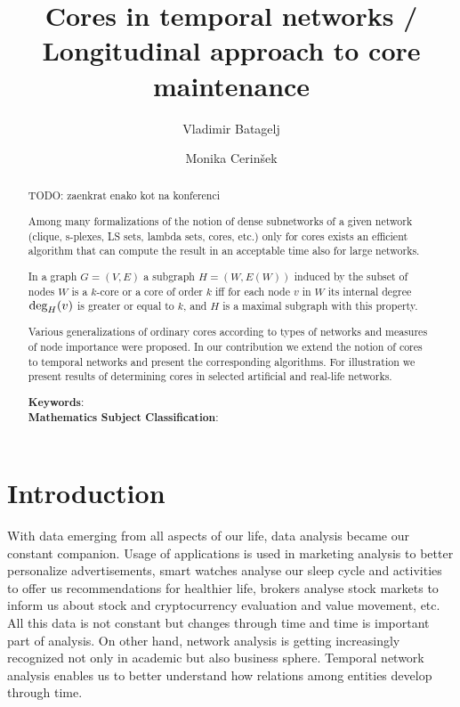 \documentclass[a4paper,twoside,10pt]{article}
\newcommand{\Deg}{\mbox{\rm{deg}}}
\begin{document}
\pagestyle{empty}


\title{Cores in temporal networks / Longitudinal approach to core maintenance}
\author{Vladimir Batagelj}
\author{Monika Cerin\v sek}
\maketitle

\pagestyle{plain}

%
%

\begin{abstract}
TODO: zaenkrat enako kot na konferenci

Among many formalizations of the notion of dense subnetworks of a given network (clique, s-plexes, LS sets, lambda sets, cores, etc.) only for cores exists an efficient algorithm that can compute the result in an acceptable time also for large networks.

In a graph $G = (V, E)$ a subgraph $H = (W, E(W))$ induced by the subset of nodes $W$ is a $k$-core or a core of order $k$ iff for each node $v$ in $W$ its internal degree $\Deg_H(v)$ is greater or equal to $k$, and $H$ is a maximal subgraph with this property.

Various generalizations of ordinary cores according to types of networks and measures of node importance were proposed. In our contribution we extend the notion of cores to temporal networks and present the corresponding algorithms. For illustration we present results of determining cores in selected artificial and real-life networks.

\noindent
{\bf Keywords}: \\
{\bf Mathematics Subject Classification}:

\end{abstract}




\section{Introduction}\label{intro}
With data emerging from all aspects of our life, data analysis became our constant companion. Usage of applications is used in marketing analysis to better personalize advertisements, smart watches analyse our sleep cycle and activities to offer us recommendations for healthier life, brokers analyse stock markets to inform us about stock and cryptocurrency evaluation and value movement, etc. All this data is not constant but changes through time and time is important part of analysis. On other hand, network analysis is getting increasingly recognized not only in academic but also business sphere. Temporal network analysis enables us to better understand how relations among entities develop through time.
\end{document}
